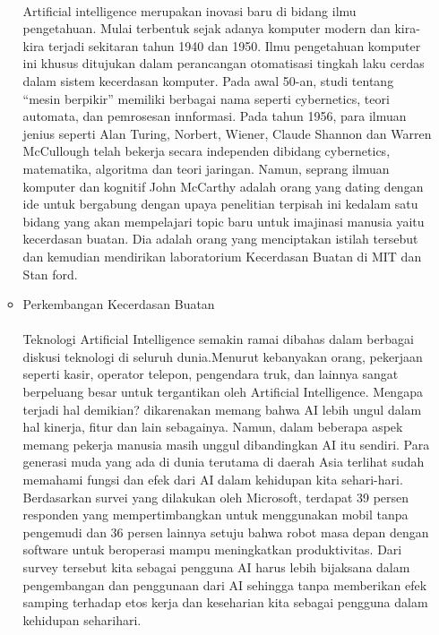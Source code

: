 \begin{enumerate}
\begin{itemize}
				 \paragraph{}
				Artificial intelligence merupakan inovasi baru di bidang ilmu pengetahuan. Mulai terbentuk sejak adanya komputer modern dan kira-kira terjadi sekitaran tahun 1940 dan 1950. Ilmu pengetahuan komputer ini khusus ditujukan dalam perancangan otomatisasi tingkah laku cerdas dalam sistem kecerdasan komputer. Pada awal 50-an, studi tentang “mesin berpikir” memiliki berbagai nama seperti cybernetics, teori automata, dan pemrosesan innformasi. Pada tahun 1956, para ilmuan jenius seperti Alan Turing, Norbert, Wiener, Claude Shannon dan Warren McCullough telah bekerja secara independen dibidang cybernetics, matematika, algoritma dan teori jaringan. Namun, seprang ilmuan komputer dan kognitif John McCarthy adalah orang yang dating dengan ide untuk bergabung dengan upaya penelitian terpisah ini kedalam satu bidang yang akan mempelajari topic baru untuk imajinasi manusia yaitu kecerdasan buatan. Dia adalah orang yang menciptakan istilah tersebut dan kemudian mendirikan laboratorium Kecerdasan Buatan di MIT dan Stan
				ford.
				
			\item Perkembangan Kecerdasan Buatan
			
				\paragraph{}
				Teknologi Artificial Intelligence semakin ramai dibahas dalam berbagai diskusi teknologi di seluruh dunia.Menurut kebanyakan orang, pekerjaan seperti kasir, operator telepon, pengendara truk, dan lainnya sangat berpeluang besar untuk tergantikan oleh Artificial Intelligence. Mengapa terjadi hal demikian? dikarenakan memang bahwa AI lebih ungul dalam hal kinerja, fitur dan lain sebagainya. Namun, dalam beberapa aspek memang pekerja manusia masih unggul dibandingkan AI itu sendiri. Para generasi muda yang ada di dunia terutama di daerah Asia terlihat sudah memahami fungsi dan efek dari AI dalam kehidupan kita sehari-hari. Berdasarkan survei yang dilakukan oleh Microsoft, terdapat 39 persen responden yang mempertimbangkan untuk menggunakan mobil tanpa pengemudi dan 36 persen lainnya setuju bahwa robot masa depan dengan software untuk beroperasi mampu meningkatkan produktivitas. Dari survey tersebut kita sebagai pengguna AI harus lebih bijaksana dalam pengembangan dan penggunaan dari AI sehingga tanpa memberikan efek samping terhadap etos kerja dan keseharian kita sebagai pengguna dalam kehidupan seharihari.
				

\end{itemize}
\end{enumerate}
